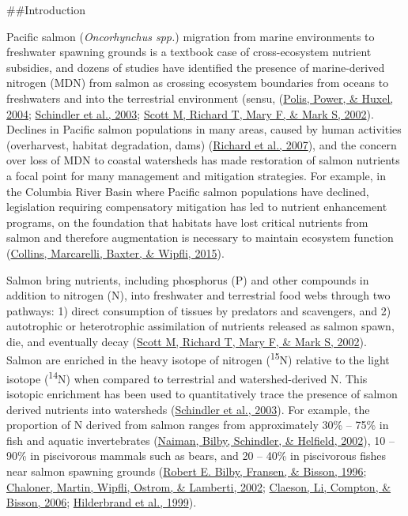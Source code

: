 \documentclass [11pt, proquest] {uwthesis}[2015/03/03]
\begin{document}
\#\#Introduction

Pacific salmon (\emph{Oncorhynchus spp.}) migration from marine environments to freshwater spawning grounds is a textbook case of cross-ecosystem nutrient subsidies, and dozens of studies have identified the presence of marine-derived nitrogen (MDN) from salmon as crossing ecosystem boundaries from oceans to freshwaters and into the terrestrial environment (sensu, (\protect\hyperlink{ref-Polis2004}{Polis, Power, \& Huxel, 2004}; \protect\hyperlink{ref-Schindler2003}{Schindler et al., 2003}; \protect\hyperlink{ref-Gende2002}{Scott M, Richard T, Mary F, \& Mark S, 2002}). Declines in Pacific salmon populations in many areas, caused by human activities (overharvest, habitat degradation, dams) (\protect\hyperlink{ref-Gustafson2007}{Richard et al., 2007}), and the concern over loss of MDN to coastal watersheds has made restoration of salmon nutrients a focal point for many management and mitigation strategies. For example, in the Columbia River Basin where Pacific salmon populations have declined, legislation requiring compensatory mitigation has led to nutrient enhancement programs, on the foundation that habitats have lost critical nutrients from salmon and therefore augmentation is necessary to maintain ecosystem function (\protect\hyperlink{ref-Collins2015}{Collins, Marcarelli, Baxter, \& Wipfli, 2015}).

Salmon bring nutrients, including phosphorus (P) and other compounds in addition to nitrogen (N), into freshwater and terrestrial food webs through two pathways: 1) direct consumption of tissues by predators and scavengers, and 2) autotrophic or heterotrophic assimilation of nutrients released as salmon spawn, die, and eventually decay (\protect\hyperlink{ref-Gende2002}{Scott M, Richard T, Mary F, \& Mark S, 2002}). Salmon are enriched in the heavy isotope of nitrogen (\textsuperscript{15}N) relative to the light isotope (\textsuperscript{14}N) when compared to terrestrial and watershed-derived N. This isotopic enrichment has been used to quantitatively trace the presence of salmon derived nutrients into watersheds (\protect\hyperlink{ref-Schindler2003}{Schindler et al., 2003}). For example, the proportion of N derived from salmon ranges from approximately 30\% -- 75\% in fish and aquatic invertebrates (\protect\hyperlink{ref-Naiman2002}{Naiman, Bilby, Schindler, \& Helfield, 2002}), 10 -- 90\% in piscivorous mammals such as bears, and 20 -- 40\% in piscivorous fishes near salmon spawning grounds (\protect\hyperlink{ref-Bilby1996}{Robert E. Bilby, Fransen, \& Bisson, 1996}; \protect\hyperlink{ref-Chaloner2002}{Chaloner, Martin, Wipfli, Ostrom, \& Lamberti, 2002}; \protect\hyperlink{ref-Claeson2006}{Claeson, Li, Compton, \& Bisson, 2006}; \protect\hyperlink{ref-Hilderbrand1999}{Hilderbrand et al., 1999}).
\end{document}

